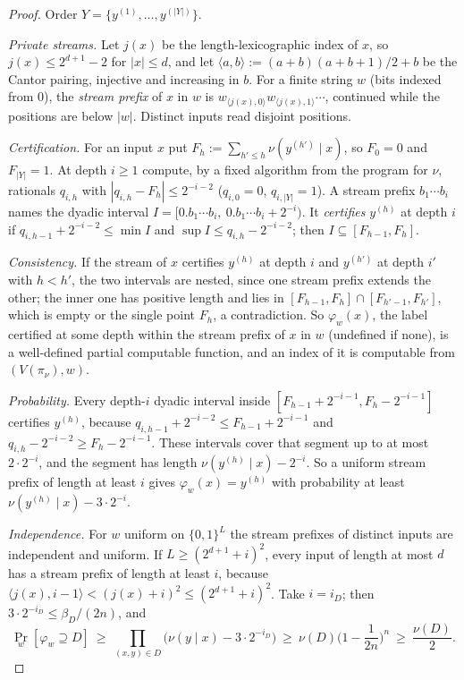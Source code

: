 \begin{proof} Order $Y=\{y^{(1)},\dots,y^{(|Y|)}\}$.

\emph{Private streams.} Let $j(x)$ be the length-lexicographic index of $x$, so $j(x)\le2^{d+1}-2$ for $|x|\le d$, and let $\langle a,b\rangle:=(a+b)(a+b+1)/2+b$ be the Cantor pairing, injective and increasing in $b$. For a finite string $w$ (bits indexed from $0$), the \emph{stream prefix} of $x$ in $w$ is $w_{\langle j(x),0\rangle}w_{\langle j(x),1\rangle}\cdots$, continued while the positions are below $|w|$. Distinct inputs read disjoint positions.

\emph{Certification.} For an input $x$ put $F_h:=\sum_{h'\le h}\nu(y^{(h')}\mid x)$, so $F_0=0$ and $F_{|Y|}=1$. At depth $i\ge1$ compute, by a fixed algorithm from the program for $\nu$, rationals $q_{i,h}$ with $|q_{i,h}-F_h|\le2^{-i-2}$ ($q_{i,0}=0$, $q_{i,|Y|}=1$). A stream prefix $b_1\cdots b_i$ names the dyadic interval $I=[0.b_1\cdots b_i,\ 0.b_1\cdots b_i+2^{-i})$. It \emph{certifies} $y^{(h)}$ at depth $i$ if $q_{i,h-1}+2^{-i-2}\le\min I$ and $\sup I\le q_{i,h}-2^{-i-2}$; then $I\subseteq[F_{h-1},F_h]$.

\emph{Consistency.} If the stream of $x$ certifies $y^{(h)}$ at depth $i$ and $y^{(h')}$ at depth $i'$ with $h<h'$, the two intervals are nested, since one stream prefix extends the other; the inner one has positive length and lies in $[F_{h-1},F_h]\cap[F_{h'-1},F_{h'}]$, which is empty or the single point $F_h$, a contradiction. So $\varphi_w(x)$, the label certified at some depth within the stream prefix of $x$ in $w$ (undefined if none), is a well-defined partial computable function, and an index of it is computable from $(V(\pi_\nu),w)$.

\emph{Probability.} Every depth-$i$ dyadic interval inside $[F_{h-1}+2^{-i-1},F_h-2^{-i-1}]$ certifies $y^{(h)}$, because $q_{i,h-1}+2^{-i-2}\le F_{h-1}+2^{-i-1}$ and $q_{i,h}-2^{-i-2}\ge F_h-2^{-i-1}$. These intervals cover that segment up to at most $2\cdot2^{-i}$, and the segment has length $\nu(y^{(h)}\mid x)-2^{-i}$. So a uniform stream prefix of length at least $i$ gives $\varphi_w(x)=y^{(h)}$ with probability at least $\nu(y^{(h)}\mid x)-3\cdot2^{-i}$.

\emph{Independence.} For $w$ uniform on $\{0,1\}^L$ the stream prefixes of distinct inputs are independent and uniform. If $L\ge(2^{d+1}+i)^2$, every input of length at most $d$ has a stream prefix of length at least $i$, because $\langle j(x),i-1\rangle<(j(x)+i)^2\le(2^{d+1}+i)^2$. Take $i=i_D$; then $3\cdot2^{-i_D}\le\beta_D/(2n)$, and
\[
\Pr_w[\varphi_w\supseteq D]\ \ge\ \prod_{(x,y)\in D}\big(\nu(y\mid x)-3\cdot2^{-i_D}\big)\ \ge\ \nu(D)\Big(1-\frac1{2n}\Big)^n\ \ge\ \frac{\nu(D)}2 .
\]


\end{proof}
